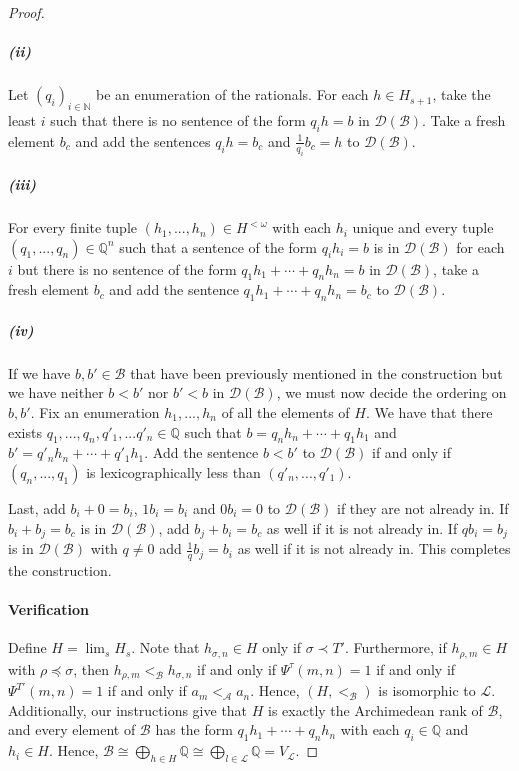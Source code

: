\documentclass[10pt,a4paper]{amsart}
\newcommand{\A}{\mathcal{A}}
\newcommand{\B}{\mathcal{B}}
\newcommand{\D}{\mathcal{D}}
\newcommand{\LL}{\mathcal{L}}
\newcommand{\N}{\mathbb{N}}
\newcommand{\Q}{\mathbb{Q}}
\newcommand{\lom}{^{< \omega}}
\begin{document}
\begin{proof}
\subparagraph{(ii)} Let $(q_i)_{i\in \N}$ be an enumeration of the rationals. For each $h\in H_{s+1}$, take the least $i$ such that there is no sentence of the form $q_i h=b$ in $\D(\B)$. Take a fresh element $b_c$ and add the sentences $q_i h = b_c$ and $\frac{1}{q_i} b_c=h$ to $\D(\B)$. \\

\subparagraph{(iii)} For every finite tuple $(h_1,...,h_n)\in H\lom$ with each $h_i$ unique and every tuple $(q_1,...,q_n)\in\Q^n $ such that a sentence of the form $q_i h_i= b$ is in $\D(\B)$ for each $i$ but there is no sentence of the form $q_1h_1 + \cdots +q_nh_n= b $ in $\D(\B)$, take a fresh element $b_c$ and add the sentence $q_1h_1 + \cdots +q_nh_n= b_c$ to $\D(\B)$. \\

\subparagraph{(iv)} If we have $b,b'\in \B$ that have been previously mentioned in the construction but we have neither $b<b'$ nor $b'<b$ in $\D(\B)$, we must now decide the ordering on $b,b'$. Fix an enumeration $h_1,...,h_n$ of all the elements of $H$. We have that there exists $q_1,...,q_n,q'_1,...q'_n\in \Q$ such that $b=q_nh_n+ \cdots +q_1 h_1$ and $b'= q'_nh_n + \cdots +q'_1 h_1$. Add the sentence $b<b'$ to $\D(\B)$ if and only if $(q_n,...,q_1)$ is lexicographically less than $(q'_n,...,q'_1)$. 

Last, add $b_i+ 0 = b_i$, $1b_i=b_i$ and $0b_i= 0$ to $\D(\B)$ if they are not already in. If $b_i+b_j=b_c$ is in $\D(\B)$, add $b_j + b_i = b_c$ as well if it is not already in. If $qb_i=b_j$ is in $\D(\B)$ with $q\neq 0$ add $\frac{1}{q}b_j=b_i$ as well if it is not already in. This completes the construction.\\

\paragraph{Verification}
Define $H=\lim_sH_s$. Note that $h_{\sigma,n}\in H$ only if $\sigma\prec T'$. Furthermore, if $h_{\rho,m}\in H$ with $\rho\preceq\sigma$, then $h_{\rho,m}<_\B h_{\sigma,n}$ if and only if $\Psi^\tau(m,n)=1$ if and only if $\Psi^{T'}(m,n)=1$ if and only if $a_m<_\A a_n$. Hence, $(H,<_\B)$ is isomorphic to $\LL$. Additionally, our instructions give that $H$ is exactly the Archimedean rank of $\B$, and every element of $\B$ has the form $q_1 h_1 + \cdots + q_nh_n$ with each $q_i\in \Q$ and $h_i\in H$. Hence, $\B\cong \bigoplus_{h\in H} \Q \cong \bigoplus_{l\in \LL} \Q = V_\LL$. 
\end{proof}
\end{document}
